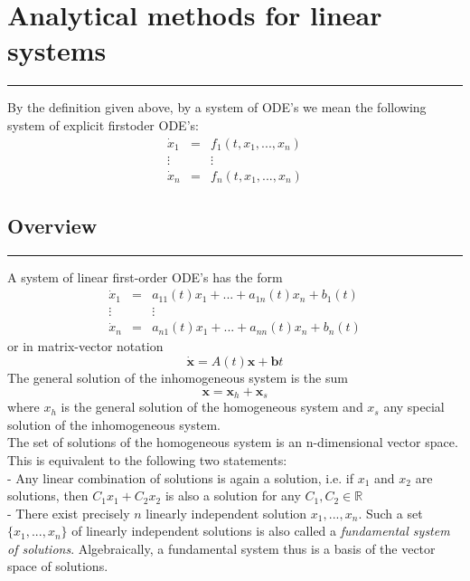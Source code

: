 \section{Analytical methods for linear systems}
\noindent\rule[\linienAbstand]{\linewidth}{\linienDickeDick}
By the definition given above, by a system of ODE’s we mean the following system of explicit firstoder ODE’s:
\begin{equation}
  \begin{matrix}
    \dot{x}_1 & = & f_1(t, x_1, ..., x_n)\\
    \vdots  &  & \vdots \\
    \dot{x}_n & = & f_n(t, x_1, ..., x_n)
  \end{matrix}
\end{equation}

\subsection{Overview}
\noindent\rule[\linienAbstand]{\linewidth}{\linienDicke}
A system of linear first-order ODE’s has the form
\begin{equation}
  \begin{matrix}
    \dot{x}_1 & = & a_{11}(t)x_1 + ... + a_{1n}(t)x_n + b_1 (t)\\
    \vdots  &  & \vdots \\
    \dot{x}_n & = & a_{n1}(t)x_1 + ... + a_{nn}(t)x_n + b_n (t)
  \end{matrix}
\end{equation}
or in matrix-vector notation
\begin{equation}
  \dot{\mathbf{x}} = A(t)\mathbf{x}+\mathbf{b}t
\end{equation}
The general solution of the inhomogeneous system is the sum
\begin{equation}
  \mathbf{x} = \mathbf{x}_h+ \mathbf{x}_s
\end{equation}
where $x_h$ is the general solution of the homogeneous system and $x_s$ any special solution of the inhomogeneous system.\\

The set of solutions of the homogeneous system is an n-dimensional vector space. This is equivalent to the following two statements:\\
 - Any linear combination of solutions is again a solution, i.e. if $x_1$ and $x_2$ are solutions, then $C_1x_1 + C_2x_2$ is also a solution for any $C_1, C_2 \in \mathbb{R}$\\
 - There exist precisely $n$ linearly independent solution $x_1, . . . , x_n$. Such a set $\{x_1, . . . , x_n\}$ of linearly independent solutions is also called a \emph{fundamental system of solutions}. Algebraically, a fundamental system thus is a basis of the vector space of solutions.\\

